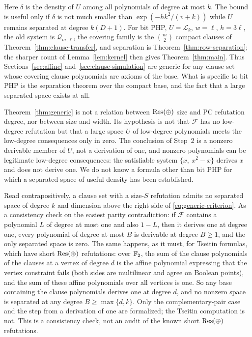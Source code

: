 Here \(\delta\) is the density of \(U\) among all polynomials of degree at
most \(k\). The bound is useful only if \(\delta\) is not much smaller than
\(\exp(-hk^2/(v+k))\) while \(U\) remains separated at degree
\(k(D+1)\). For bit PHP, \(U=\mathcal L_k\), \(w=\ell\), \(h=3\ell\), the old
system is \(\mathcal Q_{m,\ell}\), the covering family is the
\(\binom m2\) compact clauses of Theorem~\ref{thm:clause-transfer}, and
separation is Theorem~\ref{thm:row-separation}; the sharper count of
Lemma~\ref{lem:kernel} then gives Theorem~\ref{thm:main}.
Thus Sections~\ref{sec:affine} and~\ref{sec:clause-simulation} are generic
for any clause set whose covering clause polynomials are axioms of the base.
What is specific to bit PHP is the separation theorem over the compact base,
and the fact that a large separated space exists at all.

\begin{remark}\label{rem:not-tradeoff}
Theorem~\ref{thm:generic} is not a relation between \(\mathrm{Res}(\oplus)\) size and PC
refutation degree, nor between size and width. Its hypothesis is not that
\(\mathcal F\) has no low-degree refutation but that a large space \(U\) of
low-degree polynomials meets the low-degree consequences only in zero.
The conclusion of Step~2 is a nonzero derivable member of \(U\), not a
derivation of one, and nonzero polynomials can be legitimate low-degree
consequences: the satisfiable system \(\{x,\ x^2-x\}\) derives \(x\) and
does not derive one. We do not know a formula other than bit PHP for which
a separated space of useful density has been established.
\end{remark}

\begin{remark}\label{rem:short-proofs}
Read contrapositively, a clause set with a size-\(S\) refutation admits no
separated space of degree \(k\) and dimension above the right side of
\eqref{eq:generic-criterion}. As a consistency check on the easiest parity
contradiction: if \(\mathcal F\) contains a polynomial \(L\) of degree at
most one and also \(1-L\), then it derives one at degree one, every
polynomial of degree at most \(B\) is derivable at degree \(B\ge1\), and
the only separated space is zero. The same happens, as it must, for Tseitin
formulas, which have short \(\mathrm{Res}(\oplus)\) refutations: over \(\mathbb F_2\), the sum of
the clause polynomials of the clauses at a vertex of degree \(d\) is the
affine polynomial expressing that the vertex constraint fails (both sides
are multilinear and agree on Boolean points), and the sum of these affine
polynomials over all vertices is one. So any base containing the clause
polynomials derives one at degree \(d\), and no nonzero space is separated
at any degree \(B\ge\max\{d,k\}\). Only the complementary-pair case and the
step from a derivation of one are formalized; the Tseitin computation is
not. This is a consistency check, not an audit of the known short \(\mathrm{Res}(\oplus)\)
refutations.
\end{remark}

